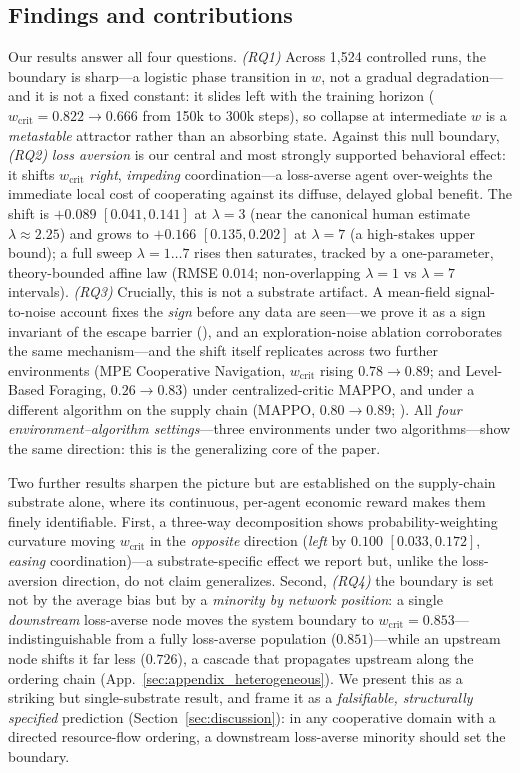 \documentclass[letterpaper]{article}
\theoremstyle{plain}
\newcommand{\wcrit}{w_{\mathrm{crit}}}
\begin{document}
\subsection{Findings and contributions}
Our results answer all four questions. \emph{(RQ1)} Across 1{,}524 controlled
runs, the boundary is sharp---a logistic phase transition in $w$, not a gradual
degradation---and it is not a fixed constant: it slides left with the training
horizon
($\wcrit = 0.822\!\to\!0.666$ from 150k to 300k steps), so collapse at
intermediate $w$ is a \emph{metastable} attractor rather than an absorbing
state. Against this null boundary, \emph{(RQ2)} \emph{loss aversion} is our
central and most strongly supported behavioral effect: it shifts $\wcrit$
\emph{right}, \emph{impeding} coordination---a loss-averse agent over-weights the
immediate local cost of cooperating against its diffuse, delayed global benefit.
The shift is $+0.089$ $[0.041, 0.141]$ at $\lambda{=}3$
(near the canonical human estimate $\lambda\approx2.25$) and grows to
$+0.166$ $[0.135, 0.202]$ at $\lambda{=}7$ (a high-stakes upper bound); a full
sweep $\lambda{=}1{\ldots}7$ rises then saturates, tracked by a one-parameter,
theory-bounded affine law (RMSE $0.014$; non-overlapping $\lambda{=}1$ vs
$\lambda{=}7$ intervals). \emph{(RQ3)} Crucially, this is not a substrate
artifact. A mean-field signal-to-noise account fixes the \emph{sign} before any
data are seen---we prove it as a sign invariant of the escape barrier
(), and an exploration-noise ablation corroborates the same
mechanism---and the shift itself replicates across two further
environments (MPE Cooperative Navigation, $\wcrit$ rising $0.78\!\to\!0.89$; and
Level-Based Foraging, $0.26\!\to\!0.83$) under
centralized-critic MAPPO, and under a different algorithm on the supply
chain (MAPPO, $0.80\!\to\!0.89$; ). All \emph{four
environment--algorithm settings}---three environments under two algorithms---show
the same direction: this is the generalizing core of the paper.

Two further results sharpen the picture but are established on the supply-chain
substrate alone, where its continuous, per-agent economic reward makes them
finely identifiable. First, a three-way decomposition shows
probability-weighting curvature moving $\wcrit$ in the \emph{opposite} direction
(\emph{left} by $0.100$ $[0.033, 0.172]$, \emph{easing} coordination)---a
substrate-specific effect we report but, unlike the loss-aversion direction, do
not claim generalizes. Second, \emph{(RQ4)} the boundary is set not by the
average bias but by a \emph{minority by network position}: a single
\emph{downstream} loss-averse node moves the system boundary to
$\wcrit = 0.853$---indistinguishable from a fully loss-averse population
($0.851$)---while an upstream node shifts it far less ($0.726$), a cascade that
propagates upstream along the ordering chain (App.~\ref{sec:appendix_heterogeneous}).
We present this as a striking but single-substrate result, and frame it as a
\emph{falsifiable, structurally specified} prediction (Section~\ref{sec:discussion}):
in any cooperative domain with a directed resource-flow ordering, a downstream
loss-averse minority should set the boundary.
\end{document}
